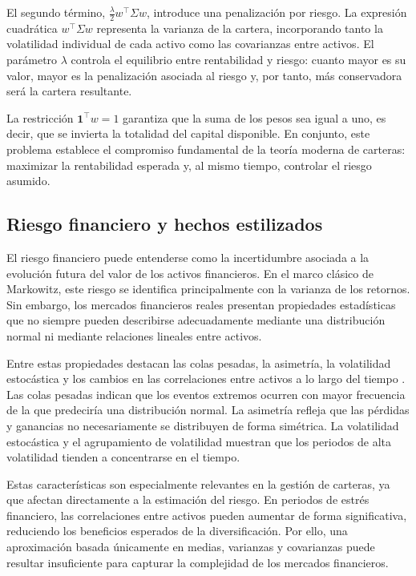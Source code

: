 El segundo término, $\frac{\lambda}{2} w^\top \Sigma w$, introduce una penalización por riesgo. La expresión cuadrática $w^\top \Sigma w$ representa la varianza de la cartera, incorporando tanto la volatilidad individual de cada activo como las covarianzas entre activos. El parámetro $\lambda$ controla el equilibrio entre rentabilidad y riesgo: cuanto mayor es su valor, mayor es la penalización asociada al riesgo y, por tanto, más conservadora será la cartera resultante.

La restricción $\mathbf{1}^\top w = 1$ garantiza que la suma de los pesos sea igual a uno, es decir, que se invierta la totalidad del capital disponible. En conjunto, este problema establece el compromiso fundamental de la teoría moderna de carteras: maximizar la rentabilidad esperada y, al mismo tiempo, controlar el riesgo asumido.

\subsection{Riesgo financiero y hechos estilizados}

El riesgo financiero puede entenderse como la incertidumbre asociada a la evolución futura del valor de los activos financieros. En el marco clásico de Markowitz, este riesgo se identifica principalmente con la varianza de los retornos. Sin embargo, los mercados financieros reales presentan propiedades estadísticas que no siempre pueden describirse adecuadamente mediante una distribución normal ni mediante relaciones lineales entre activos.

Entre estas propiedades destacan las colas pesadas, la asimetría, la volatilidad estocástica y los cambios en las correlaciones entre activos a lo largo del tiempo \cite{takahashi2019modeling}. Las colas pesadas indican que los eventos extremos ocurren con mayor frecuencia de la que predeciría una distribución normal. La asimetría refleja que las pérdidas y ganancias no necesariamente se distribuyen de forma simétrica. La volatilidad estocástica y el agrupamiento de volatilidad muestran que los periodos de alta volatilidad tienden a concentrarse en el tiempo.

Estas características son especialmente relevantes en la gestión de carteras, ya que afectan directamente a la estimación del riesgo. En periodos de estrés financiero, las correlaciones entre activos pueden aumentar de forma significativa, reduciendo los beneficios esperados de la diversificación. Por ello, una aproximación basada únicamente en medias, varianzas y covarianzas puede resultar insuficiente para capturar la complejidad de los mercados financieros.

